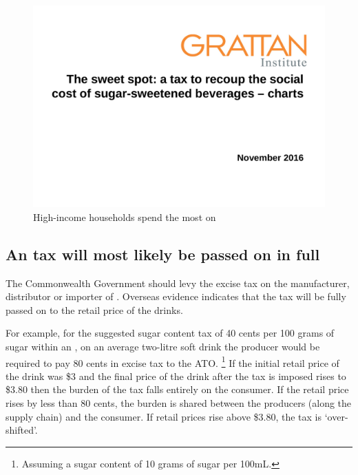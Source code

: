 \documentclass[embargoed]{grattan}
\begin{document}
\begin{figure}
\caption{High-income households spend the most on \SSBs{}}\label{fig:High-income-households-spend-the-most-on-SSBs}

\includegraphics[page=11]{atlas/ObesityCharts}


\end{figure}

\subsection{An \SSB{} tax will most likely be passed on in full}\label{an-ssb-tax-will-most-likely-be-passed-on-in-full}

The Commonwealth Government should levy the \SSB{} excise tax on the manufacturer, distributor or importer of \SSBs{}.
Overseas evidence indicates that the tax will be fully passed on to the retail price of the drinks.

For example, for the suggested sugar content tax of 40 cents per 100 grams of sugar within an \SSB{}, on an average two-litre soft drink the producer would be required to pay 80 cents in excise tax to the ATO.%
\footnote{Assuming a sugar content of 10 grams of sugar per 100mL.} If the initial retail price of the drink was \$3 and the final price of the drink after the tax is imposed rises to \$3.80 then the burden of the tax falls entirely on the consumer.
If the retail price rises by less than 80 cents, the burden is shared between the producers (along the supply chain) and the consumer.
If retail prices rise above \$3.80, the tax is `over-shifted'.
\end{document}
